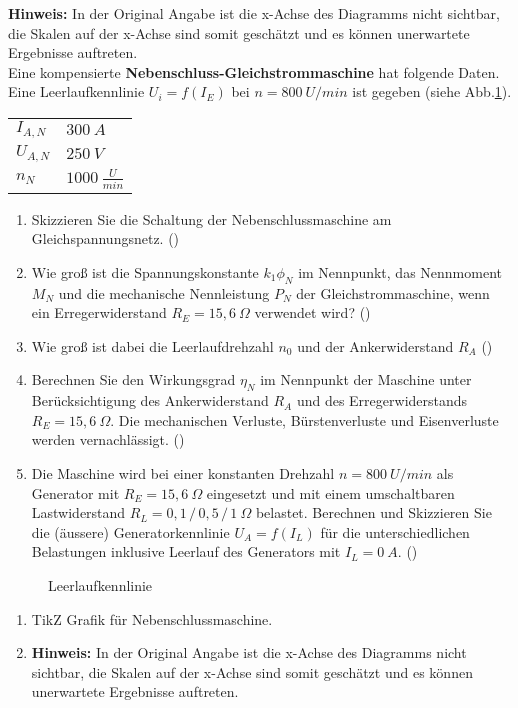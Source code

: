 \begin{question}[topic=gsm,type=exam,tags={20151014}]
\textbf{Hinweis:} In der Original Angabe ist die x-Achse des Diagramms nicht sichtbar, die Skalen auf der x-Achse sind somit geschätzt und es können unerwartete Ergebnisse auftreten.\\
Eine kompensierte \textbf{Nebenschluss-Gleichstrommaschine} hat folgende Daten. Eine Leerlaufkennlinie $U_i=f(I_E)$ bei $n=800~U/min$ ist gegeben (siehe Abb.\ref{fig:20151014}).\\
\begin{tabular}{L{2cm}l}
$I_{A,N}$ \dotfill &$300~A$\\
$U_{A,N}$ \dotfill & $250~V$ \\
$n_N$ \dotfill & $1000~\frac{U}{min}$
\end{tabular}
\begin{enumerate}
\item Skizzieren Sie die Schaltung der Nebenschlussmaschine am Gleichspannungsnetz. ()
\item Wie groß ist die Spannungskonstante $k_1 \phi_N$ im Nennpunkt, das Nennmoment $M_N$ und die mechanische Nennleistung $P_N$ der Gleichstrommaschine, wenn ein Erregerwiderstand $R_E=15,6~\Omega$ verwendet wird? ()
\item Wie groß ist dabei die Leerlaufdrehzahl $n_0$ und der Ankerwiderstand $R_A$ ()
\item Berechnen Sie den Wirkungsgrad $\eta_N$ im Nennpunkt der Maschine unter Berücksichtigung des Ankerwiderstand $R_A$ und des Erregerwiderstands $R_E = 15,6~\Omega$. Die mechanischen Verluste, Bürstenverluste und Eisenverluste werden vernachlässigt. ()
\item Die Maschine wird bei einer konstanten Drehzahl $n=800~U/min$ als Generator mit $R_E =15,6~\Omega$ eingesetzt und mit einem umschaltbaren Lastwiderstand $R_L = 0,1\, /\, 0,5\, /\, 1 ~\Omega$ belastet. Berechnen und Skizzieren Sie die (äussere) Generatorkennlinie $U_A=f(I_L)$ für die unterschiedlichen Belastungen inklusive Leerlauf des Generators mit $I_L = 0~A$. ()
\end{enumerate}
\begin{figure}[H]
\caption{Leerlaufkennlinie} \label{fig:20151014}
\end{figure}
\end{question}
\begin{solution}
\begin{enumerate}
\item TikZ Grafik für Nebenschlussmaschine.
\item \textbf{Hinweis:} In der Original Angabe ist die x-Achse des Diagramms nicht sichtbar, die Skalen auf der x-Achse sind somit geschätzt und es können unerwartete Ergebnisse auftreten.
\end{enumerate}
\end{solution}